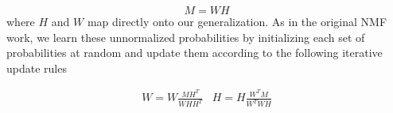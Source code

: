 $$M = W H$$
\noindent
where $H$ and $W$ map directly onto our generalization.  As in the original NMF
work, we learn these unnormalized probabilities by initializing each set of
probabilities at random and update them according to the following iterative
update rules

$$
\begin{array}{cc}
  W = W \frac{M H^T}{W H H^T} &  H = H \frac{W^T M}{W^T W H} \\
\end{array}
$$
